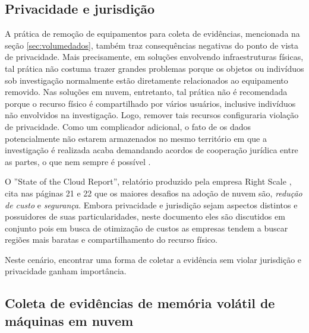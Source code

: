 \subsection{Privacidade e jurisdição}
\label{sec:violacaoprivacidadejuriscdicao}

%
%
%
A prática de remoção de equipamentos para coleta de evidências, mencionada na seção \ref{sec:volumedados}, também traz consequências negativas do ponto de vista de privacidade.
%
Mais precisamente, em soluções envolvendo infraestruturas físicas, tal prática não costuma trazer grandes problemas porque os objetos ou indivíduos sob investigação normalmente estão diretamente relacionados ao equipamento removido.
%
Nas soluções em nuvem, entretanto, tal prática não é recomendada porque o recurso físico é compartilhado por vários usuários, inclusive indivíduos não envolvidos na investigação.
%
Logo, remover tais recursos configuraria violação de privacidade.
%
Como um complicador adicional, o fato de os dados potencialmente não estarem armazenados no mesmo território em que a investigação é realizada acaba demandando acordos de cooperação jurídica entre as partes, o que nem sempre é possível \cite{SimouCloudChlng:2014}.


O ''State of the Cloud Report'', relatório produzido pela empresa Right Scale \cite{RightScale2017}, cita nas páginas 21 e 22 que os maiores desafios na adoção de nuvem são, \textit{redução de custo} e \textit{segurança}.
%
Embora privacidade e jurisdição sejam aspectos distintos e possuidores de suas particularidades, neste documento eles são discutidos em conjunto pois em busca de otimização de custos as empresas tendem a buscar regiões mais baratas e compartilhamento do recurso físico.


Neste cenário, encontrar uma forma de coletar a evidência sem violar jurisdição e privacidade ganham importância.


\subsection{Coleta de evidências de memória volátil de máquinas em nuvem}
\label{sec:forensenuvem}

